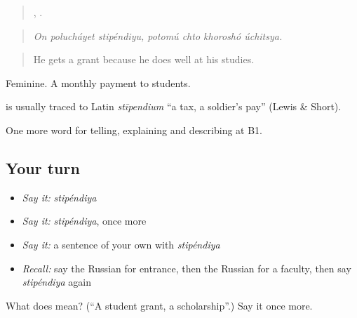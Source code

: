 \begin{quote}
  ,    .
\end{quote}

\begin{quote}
\emph{On polucháyet stipéndiyu, potomú chto khoroshó úchitsya.}
\end{quote}

\begin{quote}
He gets a grant because he does well at his studies.
\end{quote}

Feminine. A monthly payment to students.

\begin{cousinweb}
\textbf{} is usually traced to Latin \emph{stīpendium} \textquotedblleft{}a tax, a soldier’s pay\textquotedblright{} (Lewis \& Short).
\end{cousinweb}

\begin{grammarlens}[title={What you've built}]
One more word for telling, explaining and describing at B1.
\end{grammarlens}

\subsection*{Your turn}
\begin{itemize}
\raggedright
  \item \emph{Say it:} \emph{stipéndiya}
  \item \emph{Say it:} \emph{stipéndiya}, once more
  \item \emph{Say it:} a sentence of your own with \emph{stipéndiya}
  \item \emph{Recall:} say the Russian for entrance, then the Russian for a faculty, then say \emph{stipéndiya} again
\end{itemize}

\begin{tcolorbox}[breakable,colback=teal!4,colframe=teal!35!black,title={Before you move on}]
What does  mean? (\textquotedblleft{}A student grant, a scholarship\textquotedblright{}.) Say it once more.
\end{tcolorbox}
